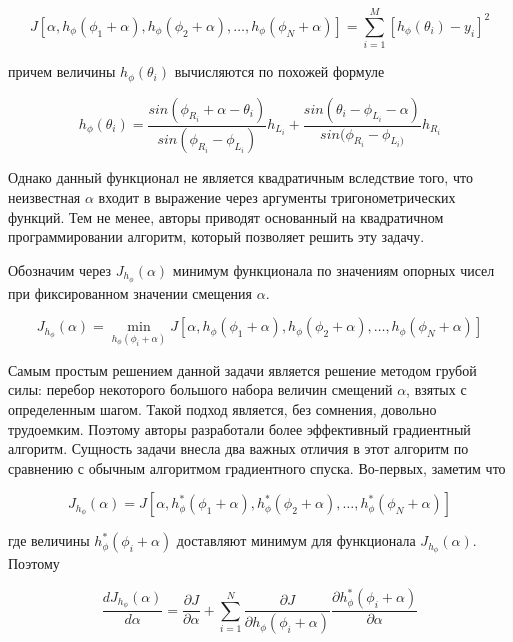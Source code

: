 \documentclass[a4paper, 12pt, titlepage]{article}
\theoremstyle{definition}
\theoremstyle{plain}
\theoremstyle{plain}
\begin{document}
\begin{equation}
J[\alpha, h_{\phi}(\phi_{1} + \alpha), h_{\phi}(\phi_{2} + \alpha), \ldots,
h_{\phi}(\phi_{N} + \alpha)] =
\sum \limits_{i = 1}^{M}[h_{\phi}(\theta_{i}) - y_{i}]^{2}
\end{equation}

причем величины $h_{\phi}(\theta_{i})$ вычисляются по похожей формуле

\begin{equation}
h_{\phi}(\theta_{i}) =
\frac{sin(\phi_{R_{i}} + \alpha - \theta_{i})}{sin(\phi_{R_{i}} - \phi_{L_{i}})}
h_{L_{i}} +
\frac{sin(\theta_{i} - \phi_{L_{i}} - \alpha)}{sin(\phi_{R_{i}} - \phi_{L_{i})}}
h_{R_{i}}
\end{equation}

Однако данный функционал не является квадратичным вследствие того, что
неизвестная $\alpha$ входит в выражение через аргументы тригонометрических
функций. Тем не менее, авторы приводят основанный на квадратичном
программировании алгоритм, который позволяет решить эту задачу.

Обозначим через $J_{h_{\phi}}(\alpha)$ минимум функционала по значениям опорных
чисел при фиксированном значении смещения $\alpha$.

\begin{equation}
J_{h_{\phi}}(\alpha) = \min_{{h_{\phi}(\phi_{i} + \alpha)}} J[\alpha,
h_{\phi}(\phi_{1} + \alpha), h_{\phi}(\phi_{2} + \alpha), \ldots,
h_{\phi}(\phi_{N} + \alpha)]
\end{equation}

Самым простым решением данной задачи является решение методом грубой
силы: перебор некоторого большого набора величин смещений $\alpha$, взятых с
определенным шагом. Такой подход является, без сомнения, довольно трудоемким.
Поэтому авторы разработали более эффективный градиентный алгоритм. Сущность
задачи внесла два важных отличия в этот алгоритм по сравнению с обычным
алгоритмом градиентного спуска. Во-первых, заметим что

\begin{equation}
J_{h_{\phi}}(\alpha) = J[\alpha,
h_{\phi}^{*}(\phi_{1} + \alpha), h_{\phi}^{*}(\phi_{2} + \alpha), \ldots,
h_{\phi}^{*}(\phi_{N} + \alpha)]
\end{equation}

где величины $h_{\phi}^{*}(\phi_{i} + \alpha)$ доставляют минимум для
функционала $J_{h_{\phi}}(\alpha)$. Поэтому

\begin{equation}
\frac{d J_{h_{\phi}}(\alpha)}{d \alpha} = \frac{\partial J}{\partial \alpha} +
\sum \limits_{i = 1}^{N} \frac{\partial J}{\partial h_{\phi}(\phi_{i} + \alpha)}
\frac{\partial h_{\phi}^{*}(\phi_{i} + \alpha) }{\partial \alpha}
\end{equation}
\end{document}
